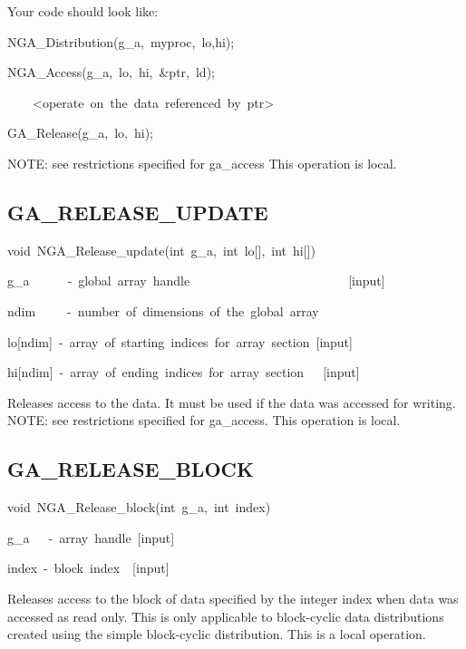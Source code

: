 Your code should look like:
\begin{lyxcode}
NGA\_Distribution(g\_a,~myproc,~lo,hi);~

NGA\_Access(g\_a,~lo,~hi,~\&ptr,~ld);~



~~~~<operate~on~the~data~referenced~by~ptr>~



GA\_Release(g\_a,~lo,~hi);
\end{lyxcode}
NOTE: see restrictions specified for ga\_access This operation is
local. 


\subsection*{\label{sub:GA_RELEASE_UPDATE}GA\_RELEASE\_UPDATE}
\begin{lyxcode}
void~NGA\_Release\_update(int~g\_a,~int~lo{[}{]},~int~hi{[}{]})



g\_a~~~~~~-~global~array~handle~~~~~~~~~~~~~~~~~~~~~~~~~{[}input{]}

ndim~~~~~-~number~of~dimensions~of~the~global~array

lo{[}ndim{]}~-~array~of~starting~indices~for~array~section~{[}input{]}

hi{[}ndim{]}~-~array~of~ending~indices~for~array~section~~~{[}input{]}
\end{lyxcode}
Releases access to the data. It must be used if the data was accessed
for writing. NOTE: see restrictions specified for ga\_access. This
operation is local.


\subsection*{\label{sub:GA_RELEASE_BLOCK}GA\_RELEASE\_BLOCK}
\begin{lyxcode}
void~NGA\_Release\_block(int~g\_a,~int~index)



g\_a~~~-~array~handle~{[}input{]}

index~-~block~index~~{[}input{]}
\end{lyxcode}
Releases access to the block of data specified by the integer index
when data was accessed as read only. This is only applicable to block-cyclic
data distributions created using the simple block-cyclic distribution.
This is a local operation. 


